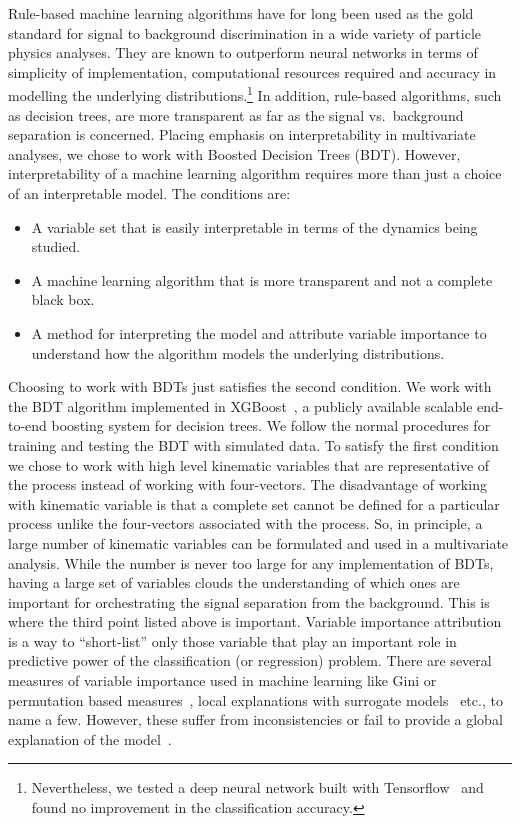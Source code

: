 Rule-based machine learning algorithms have for long been used as the gold standard for signal to background discrimination in a wide variety of particle physics analyses. They are known to outperform neural networks in terms of simplicity of implementation, computational resources required and accuracy in modelling the underlying distributions.\footnote{Nevertheless, we tested a deep neural network built with Tensorflow~\cite{tensorflow2015-whitepaper} and found no improvement in the classification accuracy.} In addition, rule-based algorithms, such as decision trees, are more transparent as far as the signal vs.~background separation is concerned. Placing emphasis on interpretability in multivariate analyses, we chose to work with Boosted Decision Trees (BDT). However, interpretability of a machine learning algorithm requires more than just a choice of an interpretable model. The conditions are:
\begin{itemize}
	\itemsep0em
	\item A variable set that is easily interpretable in terms of the dynamics being studied.
	\item A machine learning algorithm that is more transparent and not a complete black box.
	\item A method for interpreting the model and attribute variable importance to understand how the algorithm models the underlying distributions.
\end{itemize}
Choosing to work with BDTs just satisfies the second condition. We work with the BDT algorithm implemented in XGBoost~\cite{10.1145/2939672.2939785}, a publicly available scalable end-to-end boosting system for decision trees. We follow the normal procedures for training and testing the BDT with simulated data. To satisfy the first condition we chose to work with high level kinematic variables that are representative of the process instead of working with four-vectors. The disadvantage of working with kinematic variable is that a complete set cannot be defined for a particular process unlike the four-vectors associated with the process. So, in principle, a large number of kinematic variables can be formulated and used in a multivariate analysis. While the number is never too large for any implementation of BDTs, having a large set of variables clouds the understanding of which ones are important for orchestrating the signal separation from the background. This is where the third point listed above is important. Variable importance attribution is a way to ``short-list'' only those variable that play an important role in predictive power of the classification (or regression) problem. There are several measures of variable importance used in machine learning like Gini or permutation based measures~\cite{Breiman2001,JMLR:v20:18-760}, local explanations with surrogate models~\cite{10.1145/2939672.2939778} etc., to name a few. However, these suffer from inconsistencies or fail to provide a global explanation of the model~\cite{NIPS2017_7062}. 

